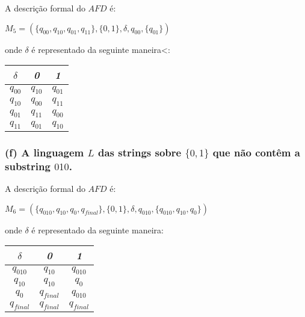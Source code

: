 \documentclass{article}
\begin{document}
A descrição formal do $AFD$ é:
\begin{center}
  $M_5 = (\{q_{00},q_{10},q_{01},q_{11}\}, \{0,1\},\delta,q_{00}, \{q_{01}\})$
\end{center}
onde $\delta$ é representado da seguinte maneira<:
\begin{table}[htbp]
  \centering
  \begin{tabular}{c|cc}
    \textit{$\delta$} & \textit{0}        & \textit{1}        \\ \hline
    \textit{$q_{00}$} & \textit{$q_{10}$} & \textit{$q_{01}$} \\
    \textit{$q_{10}$} & \textit{$q_{00}$} & \textit{$q_{11}$} \\
    \textit{$q_{01}$} & \textit{$q_{11}$} & \textit{$q_{00}$} \\
    $q_{11}$          & $q_{01}$          & $q_{10}$
  \end{tabular}
\end{table}

\subsubsection*{(f) A linguagem $L$ das strings sobre $\{0, 1\}$ que não contêm a substring $010$.}

\begin{center}
\end{center}

A descrição formal do $AFD$ é:
\begin{center}
  $M_6 = (\{q_{010},q_{10},q_{0},q_{final}\}, \{0,1\},\delta,q_{010}, \{q_{010},q_{10},q_{0}\})$
\end{center}
\pagebreak
onde $\delta$ é representado da seguinte maneira:

\begin{table}[htbp]
  \centering
  \begin{tabular}{c|cc}
    \textit{$\delta$}  & \textit{0}           & \textit{1}         \\ \hline
    \textit{$q_{010}$} & \textit{$q_{10}$}    & \textit{$q_{010}$} \\
    \textit{$q_{10}$}  & \textit{$q_{10}$}    & \textit{$q_{0}$}   \\
    \textit{$q_{0}$}   & \textit{$q_{final}$} & \textit{$q_{010}$} \\
    $q_{final}$        & $q_{final}$          & $q_{final}$
  \end{tabular}
\end{table}
\end{document}
